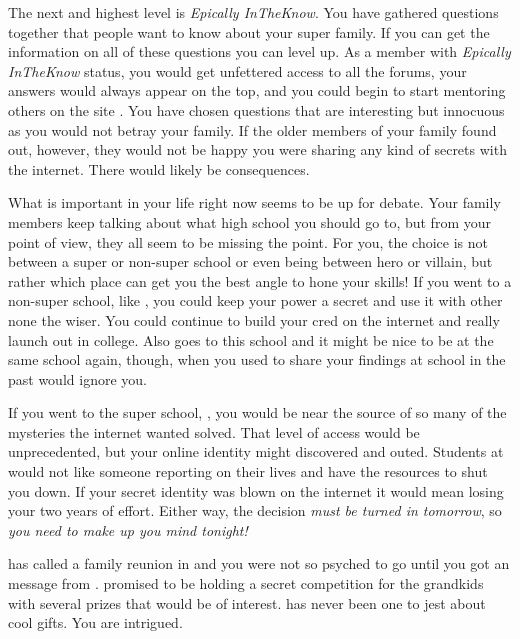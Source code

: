 \documentclass[char]{LRSguildcamp1}
\begin{document}
The next and highest level is \textsl{Epically InTheKnow}. You have gathered questions together that people want to know about your super family. If you can get the information on all of these questions you can level up. As a member with \textit{Epically InTheKnow} status, you would get unfettered access to all the forums, your answers would always appear on the top, and you could begin to start mentoring others on the site \pTweenwebsite{}. You have chosen questions that are interesting but innocuous as you would not betray your family. If the older members of your family found out, however, they would not be happy you were sharing any kind of secrets with the internet. There would likely be consequences. 

What is important in your life right now seems to be up for debate. Your family members keep talking about what high school you should go to, but from your point of view, they all seem to be missing the point. For you, the choice is not between a super or non-super school or even being  between hero or villain, but rather which place can get you the best angle to hone your skills! If you went to a non-super school, like \pNormalSchool{}, you could keep your power a secret and use it with other none the wiser. You could continue to build your cred on the internet and really launch out in college. Also \cTeen{} goes to this school and it might be nice to be at the same school again, though, when you used to share your findings at school in the past \cTeen{} would ignore you. 

If you went to the super school, \pSuperSchool{}, you would be near the source of so many of the mysteries the internet wanted solved. That level of access would be unprecedented, but your online identity might discovered and outed. Students at \pSuperSchool{} would not like someone reporting on their lives and have the resources to shut you down. If your secret identity was blown on the internet it would mean losing your two years of effort. Either way, the decision \textsl{must be turned in tomorrow}, so \textit{you need to make up you mind tonight!}

\cGrandma{} has called a family reunion in \pCityGrandma{} and you were not so psyched to go until you got an message from \cGrandma{\them}. \cGrandma{\Theyhave} promised to be holding a secret competition for the grandkids with several prizes that would be of interest. \cGrandma{} has never been one to jest about cool gifts. You are intrigued.  
\end{document}

